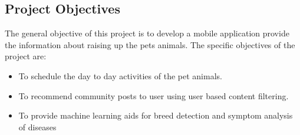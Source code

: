 \subsection{Project Objectives}
\justify
The general objective of this project is to develop a mobile application provide the information about raising up the pets animals. The specific objectives of the project are:
\vspace{-0.8em}
\begin{itemize}
    \item To schedule the day to day activities of the pet animals.
    \item To recommend community posts to user using user based content filtering.
    \item To provide machine learning aids for breed detection and symptom analysis of diseases
\end{itemize}
